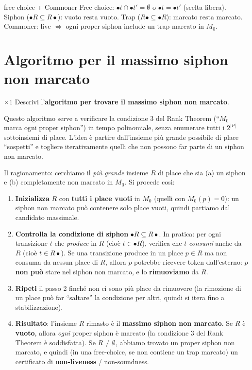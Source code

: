 \begin{puntochiave}{free-choice + Commoner}
Free-choice: $\bullet t\cap\bullet t'=\emptyset$ o $\bullet t=\bullet t'$ (scelta libera). Siphon ($\bullet R\subseteq R\bullet$): vuoto resta vuoto. Trap ($R\bullet\subseteq\bullet R$): marcato resta marcato. Commoner: live $\iff$ ogni proper siphon include un trap marcato in $M_0$.
\end{puntochiave}

\section{Algoritmo per il massimo siphon non marcato}

\begin{domanda}{$\times 1$}
Descrivi l'\textbf{algoritmo per trovare il massimo siphon non marcato}.
\end{domanda}

Questo algoritmo serve a verificare la condizione 3 del Rank Theorem (``$M_0$ marca ogni proper siphon'') in tempo polinomiale, senza enumerare tutti i $2^{|P|}$ sottoinsiemi di place. L'idea è partire dall'insieme più grande possibile di place ``sospetti'' e togliere iterativamente quelli che non possono far parte di un siphon non marcato.

Il ragionamento: cerchiamo il \emph{più grande} insieme $R$ di place che sia (a) un siphon e (b) completamente non marcato in $M_0$. Si procede così:

\begin{enumerate}
  \item \textbf{Inizializza} $R$ con \textbf{tutti i place vuoti} in $M_0$ (quelli con $M_0(p) = 0$): un siphon non marcato può contenere solo place vuoti, quindi partiamo dal candidato massimale.
  \item \textbf{Controlla la condizione di siphon} $\bullet R \subseteq R\bullet$. In pratica: per ogni transizione $t$ che \emph{produce} in $R$ (cioè $t \in \bullet R$), verifica che $t$ \emph{consumi} anche da $R$ (cioè $t \in R\bullet$). Se una transizione produce in un place $p \in R$ ma non consuma da nessun place di $R$, allora $p$ potrebbe ricevere token dall'esterno: $p$ \textbf{non può} stare nel siphon non marcato, e lo \textbf{rimuoviamo} da $R$.
  \item \textbf{Ripeti} il passo 2 finché non ci sono più place da rimuovere (la rimozione di un place può far ``saltare'' la condizione per altri, quindi si itera fino a stabilizzazione).
  \item \textbf{Risultato}: l'insieme $R$ rimasto è il \textbf{massimo siphon non marcato}. Se $R$ è \textbf{vuoto}, allora \emph{ogni} proper siphon è marcato (la condizione 3 del Rank Theorem è soddisfatta). Se $R \ne \emptyset$, abbiamo trovato un proper siphon non marcato, e quindi (in una free-choice, se non contiene un trap marcato) un certificato di \textbf{non-liveness} / non-soundness.
\end{enumerate}

